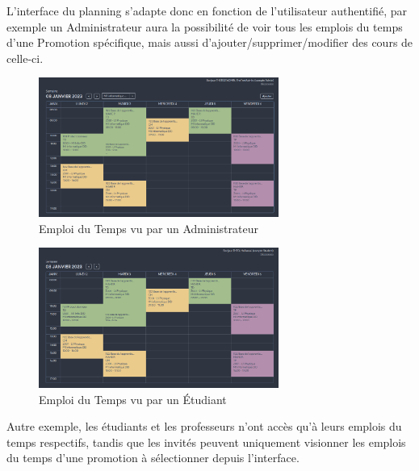 \documentclass[a4paper,french,final]{memoir}
\begin{document}
L'interface du planning s'adapte donc en fonction de l'utilisateur authentifié, par exemple un Administrateur aura la possibilité de voir tous les emplois du temps d'une Promotion spécifique, mais aussi d'ajouter/supprimer/modifier des cours de celle-ci.
\begin{figure}[!h]
    \centering
    \includegraphics[width=0.7\textwidth]{figures/adminView.png}
    \caption{Emploi du Temps vu par un Administrateur}
    \label{fig:admin_view}
\end{figure}

\begin{figure}[!h]
    \centering
    \includegraphics[width=0.7\textwidth]{figures/studentView.png}
    \caption{Emploi du Temps vu par un Étudiant}
    \label{fig:student_view}
\end{figure}
Autre exemple, les étudiants et les professeurs n'ont accès qu'à leurs emplois du temps respectifs, tandis que les invités peuvent uniquement visionner les emplois du temps d'une promotion à sélectionner depuis l'interface.
\end{document}
